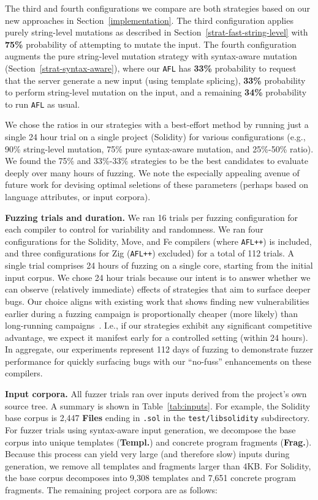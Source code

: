 The third and fourth configurations we compare are both strategies based on our
new approaches in Section~\ref{implementation}. The third configuration applies
purely string-level mutations as described in
Section~\ref{strat-fast-string-level} with \textbf{75\%} probability of
attempting to mutate the input. The fourth configuration augments the pure
string-level mutation strategy with syntax-aware mutation
(Section~\ref{strat-syntax-aware}), where our \texttt{AFL} has \textbf{33\%}
probability to request that the server generate a new input (using template
splicing), \textbf{33\%} probability to perform string-level mutation on the
input, and a remaining \textbf{34\%} probability to run \texttt{AFL} as usual.

We chose the ratios in our strategies with a best-effort method by running just
a single 24 hour trial on a single project (Solidity) for various
configurations (e.g., 90\% string-level mutation, 75\% pure syntax-aware
mutation, and 25\%-50\% ratio). We found the 75\% and 33\%-33\% strategies
to be the best candidates to evaluate deeply over many hours of fuzzing. We
note the especially appealing avenue of future work for devising optimal
seletions of these parameters (perhaps based on language attributes, or input
corpora).

\noindent \textbf{Fuzzing trials and duration.} We ran 16 trials per fuzzing
configuration for each compiler to control for variability and randomness.
We ran four configurations for the Solidity, Move, and Fe compilers (where \texttt{AFL++}) is included,
and three configurations for Zig (\texttt{AFL++}) excluded) for a total of 112 trials.
A single trial comprises 24 hours of fuzzing on a single core, starting from the initial
input corpus.
We chose 24 hour trials because our intent is to answer whether we can observe
(relatively immediate) effects of strategies that aim to surface deeper bugs.
Our choice aligns with existing work that shows finding new vulnerabilities
earlier during a fuzzing campaign is proportionally cheaper (more likely) than
long-running campaigns~\cite{fuzzexp}. I.e., if our strategies exhibit any
significant competitive advantage, we expect it manifest early for a controlled
setting (within 24 hours).
In aggregate, our experiments represent 112 days of
fuzzing to demonstrate fuzzer performance for quickly surfacing bugs with our
``no-fuss'' enhancements on these compilers.

\noindent 
\textbf{Input corpora.} All fuzzer trials ran over inputs derived from the
project's own source tree. A summary is shown in Table~\ref{tab:inputs}. For
example, the Solidity base corpus is 2,447 \textbf{Files} ending in
\texttt{.sol} in the \texttt{test/libsolidity} subdirectory.  For fuzzer trials
using syntax-aware input generation, we decompose the base corpus into unique
templates (\textbf{Templ.}) and concrete program fragments (\textbf{Frag.}).
Because this process can yield very large (and therefore slow) inputs during
generation, we remove all templates and fragments larger than 4KB.  For
Solidity, the base corpus decomposes into 9,308 templates and 7,651 concrete
program fragments.  The remaining project corpora are as follows:

